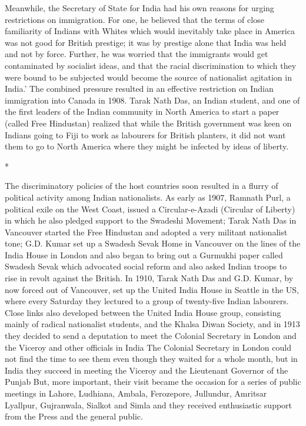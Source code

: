 Meanwhile, the Secretary of State for India had his own reasons for urging restrictions on immigration. For one, he believed that the terms of close familiarity of Indians with Whites which would inevitably take place in America was not good for British prestige; it was by prestige alone that India was held and not by force. Further, he was worried that the immigrants would get contaminated by socialist ideas, and that the racial discrimination to which they were bound to be subjected would become the source of nationalist agitation in India.’ The combined pressure resulted in an effective restriction on Indian immigration into Canada in 1908. Tarak Nath Das, an Indian student, and one of the first leaders of the Indian community in North America to start a paper (called Free Hindustan) realized that while the British government was keen on Indians going to Fiji to work as labourers for British planters, it did not want them to go to North America where they might be infected by ideas of liberty.

\begin{center}*\end{center}



The discriminatory policies of the host countries soon resulted in a flurry of political activity among Indian nationalists. As early as 1907, Ramnath Purl, a political exile on the West Coast, issued a Circular-e-Azadi (Circular of Liberty) in which he also pledged support to the Swadeshi Movement; Tarak Nath Das in Vancouver started the Free Hindustan and adopted a very militant nationalist tone; G.D. Kumar set up a Swadesh Sevak Home in Vancouver on the lines of the India House in London and also began to bring out a Gurmukhi paper called Swadesh Sevak which advocated social reform and also asked Indian troops to rise in revolt against the British. In 1910, Tarak Nath Das and G.D. Kumar, by now forced out of Vancouver, set up the United India House in Seattle in the US, where every Saturday they lectured to a group of twenty-five Indian labourers. Close links also developed between the United India House group, consisting mainly of radical nationalist students, and the Khalsa Diwan Society, and in 1913 they decided to send a deputation to meet the Colonial Secretary in London and the Viceroy and other officials in India The Colonial Secretary in London could not find the time to see them even though they waited for a whole month, but in India they succeed in meeting the Viceroy and the Lieutenant Governor of the Punjab But, more important, their visit became the occasion for a series of public meetings in Lahore, Ludhiana, Ambala, Ferozepore, Jullundur, Amritsar Lyallpur, Gujranwala, Sialkot and Simla and they received enthusiastic support from the Press and the general public.

